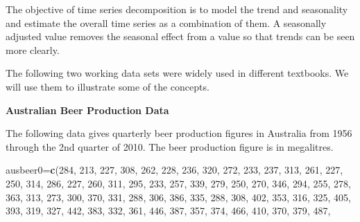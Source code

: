 \documentclass[
]{book}
\newenvironment{Shaded}{\begin{snugshade}}{\end{snugshade}}
\newcommand{\DecValTok}[1]{\textcolor[rgb]{0.00,0.00,0.81}{#1}}
\newcommand{\FunctionTok}[1]{\textcolor[rgb]{0.13,0.29,0.53}{\textbf{#1}}}
\newcommand{\NormalTok}[1]{#1}
\newcommand{\OtherTok}[1]{\textcolor[rgb]{0.56,0.35,0.01}{#1}}
\begin{document}
The objective of time series decomposition is to model the trend and seasonality and estimate the overall time series as a combination of them. A seasonally adjusted value removes the seasonal effect from a value so that trends can be seen more clearly.

The following two working data sets were widely used in different textbooks. We will use them to illustrate some of the concepts.

\textbf{Australian Beer Production Data}

The following data gives quarterly beer production figures in Australia from 1956 through the 2nd quarter of 2010. The beer production figure is in megalitres.

\begin{Shaded}
\begin{Highlighting}[]
\NormalTok{ausbeer0}\OtherTok{=}\FunctionTok{c}\NormalTok{(}\DecValTok{284}\NormalTok{, }\DecValTok{213}\NormalTok{, }\DecValTok{227}\NormalTok{, }\DecValTok{308}\NormalTok{, }\DecValTok{262}\NormalTok{, }\DecValTok{228}\NormalTok{, }\DecValTok{236}\NormalTok{, }\DecValTok{320}\NormalTok{, }\DecValTok{272}\NormalTok{, }\DecValTok{233}\NormalTok{, }\DecValTok{237}\NormalTok{, }\DecValTok{313}\NormalTok{, }\DecValTok{261}\NormalTok{, }\DecValTok{227}\NormalTok{, }\DecValTok{250}\NormalTok{, }\DecValTok{314}\NormalTok{, }
          \DecValTok{286}\NormalTok{, }\DecValTok{227}\NormalTok{, }\DecValTok{260}\NormalTok{, }\DecValTok{311}\NormalTok{, }\DecValTok{295}\NormalTok{, }\DecValTok{233}\NormalTok{, }\DecValTok{257}\NormalTok{, }\DecValTok{339}\NormalTok{, }\DecValTok{279}\NormalTok{, }\DecValTok{250}\NormalTok{, }\DecValTok{270}\NormalTok{, }\DecValTok{346}\NormalTok{, }\DecValTok{294}\NormalTok{, }\DecValTok{255}\NormalTok{, }\DecValTok{278}\NormalTok{, }\DecValTok{363}\NormalTok{, }
          \DecValTok{313}\NormalTok{, }\DecValTok{273}\NormalTok{, }\DecValTok{300}\NormalTok{, }\DecValTok{370}\NormalTok{, }\DecValTok{331}\NormalTok{, }\DecValTok{288}\NormalTok{, }\DecValTok{306}\NormalTok{, }\DecValTok{386}\NormalTok{, }\DecValTok{335}\NormalTok{, }\DecValTok{288}\NormalTok{, }\DecValTok{308}\NormalTok{, }\DecValTok{402}\NormalTok{, }\DecValTok{353}\NormalTok{, }\DecValTok{316}\NormalTok{, }\DecValTok{325}\NormalTok{, }\DecValTok{405}\NormalTok{, }
          \DecValTok{393}\NormalTok{, }\DecValTok{319}\NormalTok{, }\DecValTok{327}\NormalTok{, }\DecValTok{442}\NormalTok{, }\DecValTok{383}\NormalTok{, }\DecValTok{332}\NormalTok{, }\DecValTok{361}\NormalTok{, }\DecValTok{446}\NormalTok{, }\DecValTok{387}\NormalTok{, }\DecValTok{357}\NormalTok{, }\DecValTok{374}\NormalTok{, }\DecValTok{466}\NormalTok{, }\DecValTok{410}\NormalTok{, }\DecValTok{370}\NormalTok{, }\DecValTok{379}\NormalTok{, }\DecValTok{487}\NormalTok{, }

\end{Highlighting}
\end{Shaded}
\end{document}
